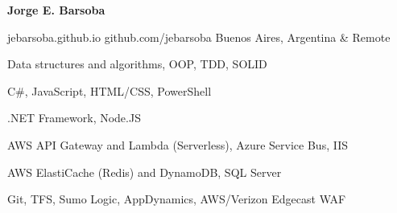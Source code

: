\documentclass[11pt]{article} %
\begin{document}
\centerline{{\Huge \bf Jorge E. Barsoba}}

\bigskip

        {jebarsoba.github.io}
        {github.com/jebarsoba}
        {Buenos Aires, Argentina \& Remote}


      {Data structures and algorithms, OOP, TDD, SOLID}

      {C\#, JavaScript, HTML/CSS, PowerShell}

      {.NET Framework, Node.JS}

      {AWS API Gateway and Lambda (Serverless), Azure Service Bus, IIS}

      {AWS ElastiCache (Redis) and DynamoDB, SQL Server}

      {Git, TFS, Sumo Logic, AppDynamics, AWS/Verizon Edgecast WAF}

\end{document}
